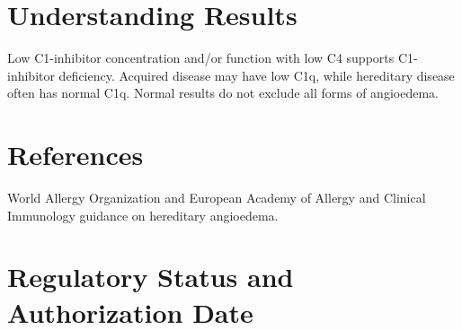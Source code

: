 \section*{Understanding Results}
Low C1-inhibitor concentration and/or function with low C4 supports C1-inhibitor deficiency. Acquired disease may have low C1q, while hereditary disease often has normal C1q. Normal results do not exclude all forms of angioedema.

\section*{References}
World Allergy Organization and European Academy of Allergy and Clinical Immunology guidance on hereditary angioedema.

\clearpage


\section*{Regulatory Status and Authorization Date}

\clearpage

